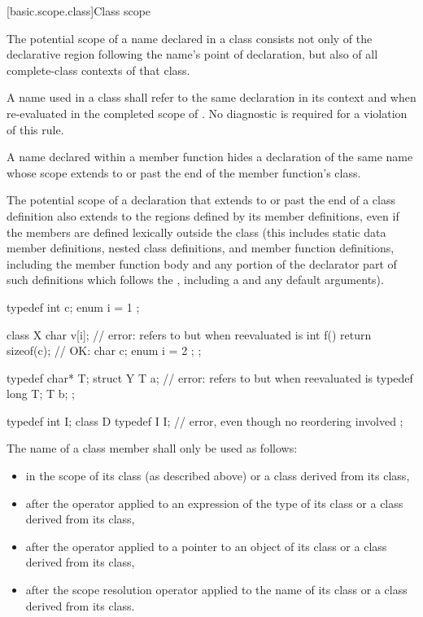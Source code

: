 [basic.scope.class]{Class scope}
%

\pnum
The potential scope of a name declared in a class consists not
only of the declarative region following the name's point of
declaration, but also of all complete-class contexts
of that class.

\pnum
A name  used in a class  shall refer to the same
declaration in its context and when re-evaluated in the completed scope
of . No diagnostic is required for a violation of this rule.

\pnum
A name declared within a member function hides a declaration of
the same name whose scope extends to or past the end of the member
function's class.

\pnum
The potential scope of a declaration that extends to or past the
end of a class definition also extends to the regions defined by its
member definitions, even if the members are defined lexically outside
the class (this includes static data member definitions, nested class
definitions, and member function definitions, including the member function
body and any portion of the
declarator part of such definitions which follows the ,
including a  and any default
arguments).

\pnum
\begin{example}
\begin{codeblock}
typedef int  c;
enum { i = 1 };

class X {
  char  v[i];                       // error:  refers to  but when reevaluated is 
  int  f() { return sizeof(c); }    // OK: 
  char  c;
  enum { i = 2 };
};

typedef char*  T;
struct Y {
  T  a;                             // error:  refers to  but when reevaluated is 
  typedef long  T;
  T  b;
};

typedef int I;
class D {
  typedef I I;                      // error, even though no reordering involved
};
\end{codeblock}
\end{example}

\pnum
The name of a class member shall only be used as follows:
\begin{itemize}
\item in the scope of its class (as described above) or a class derived
from its class,
\item after the  operator applied to an expression of the type
of its class or a class derived from its class,
\item after the \tcode{->} operator applied to a pointer to an object of
its class or a class derived from its class,
\item after the \tcode{::} scope resolution operator
applied to the name of its class or a class derived from its class.
\end{itemize}

